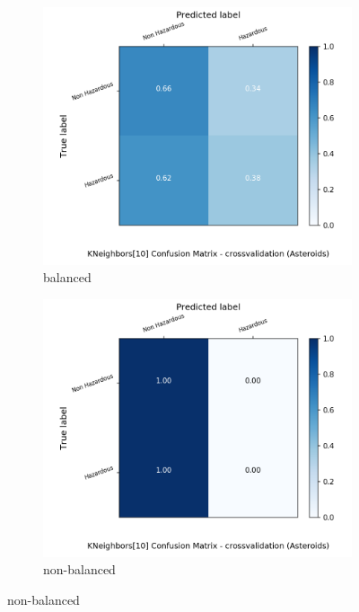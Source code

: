 \begin{figure}[H]
	\centering
	\begin{subfigure}{.5\textwidth}
		\centering
		\includegraphics[width=1.1\textwidth]{Plots/asteroids/asteroids_KNeighbors_10_balance_True_crossvalidation.png}
		\caption{balanced}
	\end{subfigure}%
	\begin{subfigure}{.5\textwidth}
		\centering
		\includegraphics[width=1.1\textwidth]{Plots/asteroids/asteroids_KNeighbors_10_balance_False_crossvalidation.png}
		\caption{non-balanced}
	\end{subfigure}
\end{figure}

